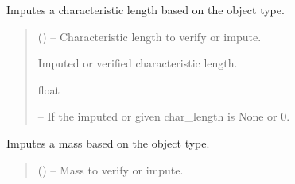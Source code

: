 \documentclass[letterpaper,10pt,english]{sphinxmanual}
\begin{document}
\begin{fulllineitems}
\begin{fulllineitems}
\begin{quote}
\begin{description}
\end{description}\end{quote}

\end{fulllineitems}


\begin{fulllineitems}
\label{\detokenize{fspsim.utils:fspsim.utils.SpaceObject.SpaceObject.impute_char_length}}
\pysigstartsignatures
{}
\pysigstopsignatures
\sphinxAtStartPar
Imputes a characteristic length based on the object type.
\begin{quote}\begin{description}
\sphinxAtStartPar
{} () – Characteristic length to verify or impute.

\sphinxAtStartPar
Imputed or verified characteristic length.

\sphinxAtStartPar
float

\sphinxAtStartPar
{} – If the imputed or given char\_length is None or 0.

\end{description}\end{quote}

\end{fulllineitems}


\begin{fulllineitems}
\label{\detokenize{fspsim.utils:fspsim.utils.SpaceObject.SpaceObject.impute_mass}}
\pysigstartsignatures
{}
\pysigstopsignatures
\sphinxAtStartPar
Imputes a mass based on the object type.
\begin{quote}\begin{description}
\sphinxAtStartPar
{} () – Mass to verify or impute.


\end{description}
\end{quote}
\end{fulllineitems}
\end{fulllineitems}
\end{document}

